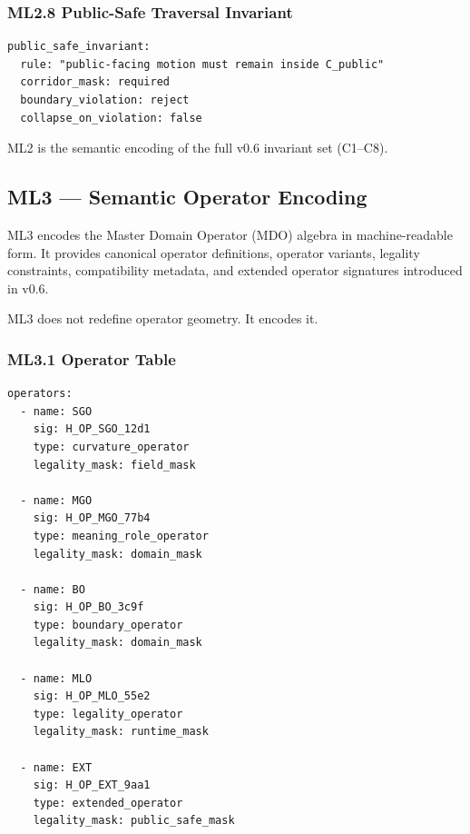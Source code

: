 \subsubsection*{ML2.8 Public-Safe Traversal Invariant}

\begin{verbatim}
public_safe_invariant:
  rule: "public-facing motion must remain inside C_public"
  corridor_mask: required
  boundary_violation: reject
  collapse_on_violation: false
\end{verbatim}

ML2 is the semantic encoding of the full v0.6 invariant set (C1–C8).



\subsection*{ML3 — Semantic Operator Encoding}

ML3 encodes the Master Domain Operator (MDO) algebra in machine-readable form.
It provides canonical operator definitions, operator variants, legality
constraints, compatibility metadata, and extended operator signatures introduced
in v0.6.

ML3 does not redefine operator geometry.
It encodes it.

\subsubsection*{ML3.1 Operator Table}

\begin{verbatim}
operators:
  - name: SGO
    sig: H_OP_SGO_12d1
    type: curvature_operator
    legality_mask: field_mask

  - name: MGO
    sig: H_OP_MGO_77b4
    type: meaning_role_operator
    legality_mask: domain_mask

  - name: BO
    sig: H_OP_BO_3c9f
    type: boundary_operator
    legality_mask: domain_mask

  - name: MLO
    sig: H_OP_MLO_55e2
    type: legality_operator
    legality_mask: runtime_mask

  - name: EXT
    sig: H_OP_EXT_9aa1
    type: extended_operator
    legality_mask: public_safe_mask
\end{verbatim}

